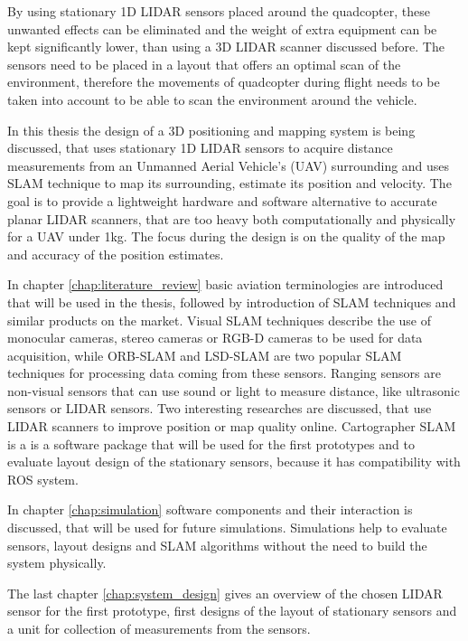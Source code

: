 By using stationary 1D LIDAR sensors placed around the quadcopter, these unwanted effects can be eliminated and the weight of 
extra equipment can be kept significantly lower, than using a 3D LIDAR scanner discussed before. The sensors need to be placed
in a layout that offers an optimal scan of the environment, therefore the movements of quadcopter during flight needs to be 
taken into account to be able to scan the environment around the vehicle.

In this thesis the design of a 3D positioning and mapping system is being discussed, that uses stationary 1D LIDAR sensors to 
acquire distance measurements from an Unmanned Aerial Vehicle's (UAV) surrounding and uses SLAM technique to map its 
surrounding, estimate its position and velocity. The goal is to provide a lightweight hardware and software alternative to 
accurate planar LIDAR scanners, that are too heavy both computationally and physically for a UAV under 1kg. The focus during 
the design is on the quality of the map and accuracy of the position estimates.

In chapter \ref{chap:literature_review} basic aviation terminologies are introduced that will be used in the thesis, followed
by introduction of SLAM techniques and similar products on the market. Visual SLAM techniques describe the use of monocular 
cameras, stereo cameras or RGB-D cameras to be used for data acquisition, while ORB-SLAM and LSD-SLAM are two popular SLAM
techniques for processing data coming from these sensors. Ranging sensors are non-visual sensors that can use sound
or light to measure distance, like ultrasonic sensors or LIDAR sensors. Two interesting researches are discussed, that use 
LIDAR scanners to improve position or map quality online. Cartographer SLAM is a is a software package that will be used
for the first prototypes and to evaluate layout design of the stationary sensors, because it has compatibility with ROS
system.

In chapter \ref{chap:simulation} software components and their interaction is discussed, that will be used for future 
simulations. Simulations help to evaluate sensors, layout designs and SLAM algorithms without the need to build the system
physically.

The last chapter \ref{chap:system_design} gives an overview of the chosen LIDAR sensor for the first prototype, first designs 
of the layout of stationary sensors and a unit for collection of measurements from the sensors.